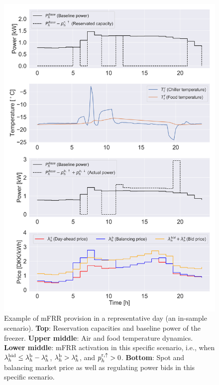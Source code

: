 \documentclass[11pt,a4paper]{article}
\begin{document}
\begin{figure}[H]
    \centering
    \includegraphics[width=\columnwidth]{figures/mFRR_single_case.png}
    \caption{Example of mFRR  provision  in a representative day (an in-sample scenario). \textbf{Top}: Reservation capacities and baseline power of the freezer. \textbf{Upper middle}: Air and food temperature dynamics. \textbf{Lower middle}: mFRR activation in this specific scenario, i.e., when $\lambda_{h}^{\rm{bid}} \leq \lambda_{h}^{\rm{b}}-\lambda_{h}^{\rm{s}}$, $\lambda_{h}^{\rm{b}} > \lambda_{h}^{\rm{s}}$, and $p^{\rm{r},\uparrow}_{h} > 0$. \textbf{Bottom}: Spot and balancing market price as well as regulating power bids in this specific scenario.}
    \label{fig:fig_second_case}
\end{figure}
\end{document}
